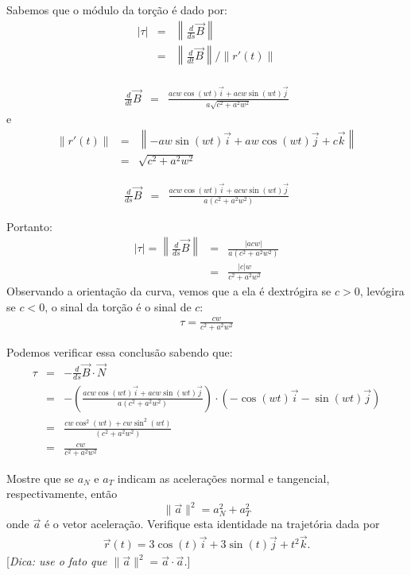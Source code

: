 \begin{resol}
Sabemos que o módulo da torção é dado por:
\begin{eqnarray*}
|\tau|&=&\left\|\frac{d}{ds}\vec{B}\right\|\\
&=& \left\|\frac{d}{dt}\vec{B} \right\|/\|r'(t)\|\\
\end{eqnarray*}

\begin{eqnarray*}
 \frac{d}{dt}\vec{B} 
&=&\frac{acw\cos(wt)\vec{i}+acw\sin(wt)\vec{j}}{a\sqrt{c^2+a^2w^2}}
\end{eqnarray*}
e
\begin{eqnarray*}
\|r'(t)\|&=&\left\|-aw\sin(wt)\vec{i}+aw\cos(wt)\vec{j}+c\vec{k}\right\|\\
&=&\sqrt{c^2+a^2w^2}
\end{eqnarray*}


\begin{eqnarray*}
 \frac{d}{ds}\vec{B} 
&=&\frac{acw\cos(wt)\vec{i}+acw\sin(wt)\vec{j}}{a(c^2+a^2w^2)}
\end{eqnarray*}

Portanto:
\begin{eqnarray*}
|\tau|=\left\|\frac{d}{ds}\vec{B}\right\|&=&
\frac{|acw|}{a(c^2+a^2w^2)}\\
&=&\frac{|c|w}{{c^2+a^2w^2}}
\end{eqnarray*}
Observando a orientação da curva, vemos que a ela é dextrógira se $c>0$, levógira se $c<0$, o sinal da torção é o sinal de $c$:
\begin{eqnarray*}
\tau=\frac{cw}{{c^2+a^2w^2}}
\end{eqnarray*}

Podemos verificar essa conclusão sabendo que:
\begin{eqnarray*}
\tau&=&-\frac{d}{ds}\vec{B}\cdot\vec{N}\\
&=&-\left(\frac{acw\cos(wt)\vec{i}+acw\sin(wt)\vec{j}}{a(c^2+a^2w^2)}\right)\cdot\left(-\cos(wt)\vec{i}-\sin(wt)\vec{j}\right)\\
&=&\frac{cw\cos^2(wt)+cw\sin^2(wt)}{(c^2+a^2w^2)}\\
&=&\frac{cw}{c^2+a^2w^2}
\end{eqnarray*}

\end{resol}

\begin{exeresol}
Mostre que se $a_N$ e $a_T$ indicam as acelerações normal e tangencial, respectivamente, então
$$\|\vec{a}\|^2=a_N^2+a_T^2$$
onde $\vec{a}$ é o vetor aceleração. Verifique esta identidade na trajetória dada por
\begin{eqnarray*}
 \vec{r}(t)=3\cos (t) \vec{i} + 3\sin (t) \vec{j} +t^2\vec{k}.
\end{eqnarray*}
[{\it Dica: use o fato que $\|\vec{a}\|^2=\vec{a}\cdot\vec{a}$.}]
\end{exeresol}

